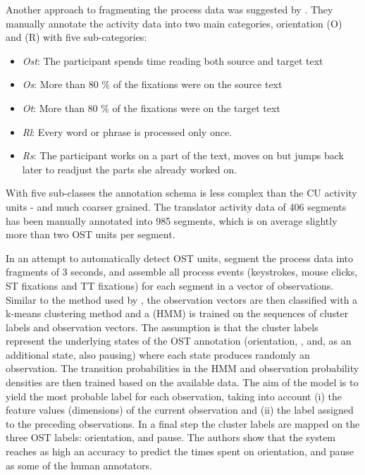 \documentclass[output=paper]{LSP/langsci}
\begin{document}
Another approach to fragmenting the process data was suggested by \citet{Nitzke2016}. They manually annotate the activity data into two main categories, orientation (O) and  (R) with five sub-categories:

\begin{itemize}
\item \textit{Ost}: The participant spends time reading both source and target text
\item \textit{Os}: More than 80 \% of the fixations were on the source text
\item \textit{Ot}: More than 80 \% of the fixations were on the target text
\item \textit{Rl}: Every word or phrase is processed only once.
\item \textit{Rs}: The participant works on a part of the text, moves on but jumps back later to readjust the parts she already worked on.
\end{itemize}

With five sub-classes the annotation schema is less complex than the CU activity units - and much coarser grained. The translator activity data of 406 segments has been manually annotated into 985 segments, which is on average slightly more than two OST units per segment. 


In an attempt to automatically detect OST units, \citet{Laubli2016} segment the process data into fragments of 3 seconds, and assemble all process events (keystrokes, mouse clicks, ST fixations and TT fixations) for each segment in a vector of observations. Similar to the method used by \citet{MartinezGomez2014Characterization}, the observation vectors are then classified with a k-means clustering method and a  (HMM) is trained on the sequences of cluster labels and observation vectors. The assumption is that the cluster labels represent the underlying states of the OST annotation (orientation, , and, as an additional state, also pausing) where each state produces randomly an observation. The transition probabilities in the HMM and observation probability densities are then trained based on the available data. The aim of the model is to yield the most probable label for each observation, taking into account (i) the feature values (dimensions) of the current observation and (ii) the label assigned to the preceding observations. In a final step the cluster labels are mapped on the three OST labels: orientation,  and pause. The authors show that the system reaches as high an accuracy to predict the times spent on orientation,  and pause as some of the human annotators.
\end{document}
